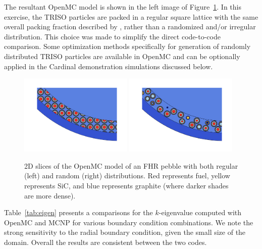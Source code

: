 The resultant OpenMC model is shown in the left image of Figure~\ref{f:openmc_pebble}.  In this exercise, the TRISO particles are packed in a regular square lattice with the same overall packing fraction described by \cite{phillips2010}, rather than a randomized and/or irregular distribution.  This choice was made to simplify the direct code-to-code comparison. Some optimization methods specifically for generation of randomly distributed TRISO particles are available in OpenMC \cite{openmcdocs_triso} and can be optionally applied in the Cardinal demonstration simulations discussed below.

\begin{figure}[!h]
\centering
\includegraphics[clip=true,width=0.48\textwidth]{Figures/pebble_yz_cropped_regular.png}
\includegraphics[clip=true,width=0.48\textwidth]{Figures/pebble_yz_cropped_random.png}
\caption{2D slices of the OpenMC model of an FHR pebble with both regular (left) and random (right) distributions.  Red represents fuel, yellow represents
SiC, and blue represents graphite (where darker shades are more dense).}
\label{f:openmc_pebble}
\end{figure}

Table~\ref{tab:eigen} presents a comparisons for the $k$-eigenvalue computed with OpenMC and MCNP for various boundary condition combinations. We note the strong sensitivity to the radial boundary condition, given the small size of the domain. Overall the results are consistent between the two codes.

